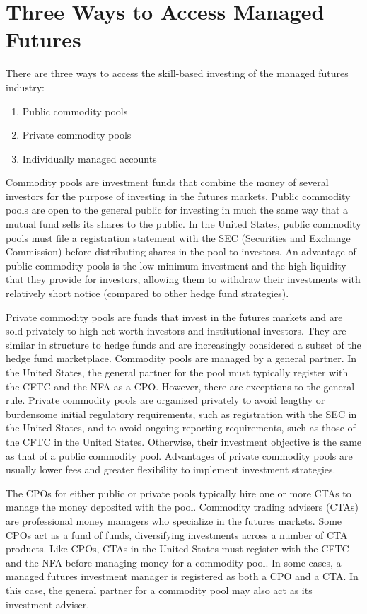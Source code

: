 \documentclass[11pt]{article}
\begin{document}
\section*{Three Ways to Access Managed Futures}
There are three ways to access the skill-based investing of the managed futures industry:

\begin{enumerate}
  \item Public commodity pools

  \item Private commodity pools

  \item Individually managed accounts

\end{enumerate}

Commodity pools are investment funds that combine the money of several investors for the purpose of investing in the futures markets. Public commodity pools are open to the general public for investing in much the same way that a mutual fund sells its shares to the public. In the United States, public commodity pools must file a registration statement with the SEC (Securities and Exchange Commission) before distributing shares in the pool to investors. An advantage of public commodity pools is the low minimum investment and the high liquidity that they provide for investors, allowing them to withdraw their investments with relatively short notice (compared to other hedge fund strategies).

Private commodity pools are funds that invest in the futures markets and are sold privately to high-net-worth investors and institutional investors. They are similar in structure to hedge funds and are increasingly considered a subset of the hedge fund marketplace. Commodity pools are managed by a general partner. In the United States, the general partner for the pool must typically register with the CFTC and the NFA as a CPO. However, there are exceptions to the general rule. Private commodity pools are organized privately to avoid lengthy or burdensome initial regulatory requirements, such as registration with the SEC in the United States, and to avoid ongoing reporting requirements, such as those of the CFTC in the United States. Otherwise, their investment objective is the same as that of a public commodity pool. Advantages of private commodity pools are usually lower fees and greater flexibility to implement investment strategies.

The CPOs for either public or private pools typically hire one or more CTAs to manage the money deposited with the pool. Commodity trading advisers (CTAs) are professional money managers who specialize in the futures markets. Some CPOs act as a fund of funds, diversifying investments across a number of CTA products. Like CPOs, CTAs in the United States must register with the CFTC and the NFA before managing money for a commodity pool. In some cases, a managed futures investment manager is registered as both a CPO and a CTA. In this case, the general partner for a commodity pool may also act as its investment adviser.
\end{document}
